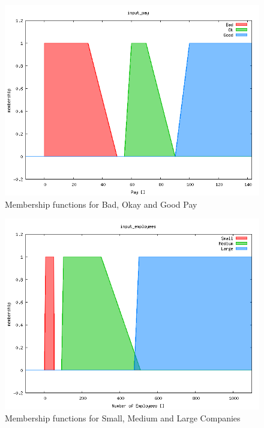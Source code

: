 \documentclass[12pt,fleqn,reqno,letterpaper]{article}
\begin{document}
\begin{figure}[H]
  \centering
  \includegraphics[scale=0.5,natwidth=640,natheight=480]{fig/baseline_input_pay.png}
  \caption{Membership functions for Bad, Okay and Good Pay}
  \label{fig:BPM}
\end{figure}
\begin{figure}[H]
  \centering
  \includegraphics[scale=0.5,natwidth=640,natheight=480]{fig/baseline_input_employees.png}
  \caption{Membership functions for Small, Medium and Large Companies}
  \label{fig:BEM}
\end{figure}
\end{document}
